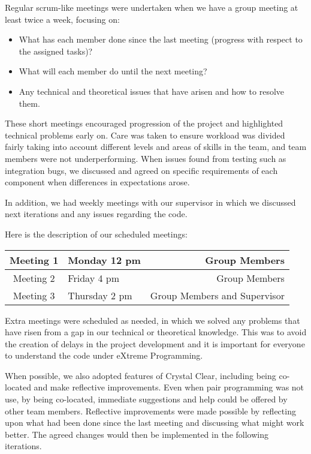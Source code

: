 Regular scrum-like meetings were undertaken when we have a group meeting at least twice a week, focusing on:

\begin{itemize}
\item What has each member done since the last meeting (progress with respect to the assigned tasks)?
\item What will each member do until the next meeting?
\item Any technical and theoretical issues that have arisen and how to resolve them.
\end{itemize}

These short meetings encouraged progression of the project and highlighted technical problems early on. Care was taken to ensure workload was divided fairly taking into account different levels and areas of skills in the team, and team members were not underperforming. When issues found from testing such as integration bugs, we discussed and agreed on specific requirements of each component when differences in expectations arose.

In addition, we had weekly meetings with our supervisor in which we discussed next iterations and any issues regarding the code.

Here is the description of our scheduled meetings:
\begin{center}
\begin{tabular}{| c | l | r |}
\hline
Meeting 1 & Monday 12 pm & Group Members \\ \hline
Meeting 2 & Friday 4 pm & Group Members \\ \hline
Meeting 3 & Thursday 2 pm & Group Members and Supervisor \\ 
\hline
\end{tabular}
\end{center}

Extra meetings were scheduled as needed, in which we solved any problems that have risen from a gap in our technical or theoretical knowledge. This was to avoid the creation of delays in the project development and it is important for everyone to understand the code under eXtreme Programming.

When possible, we also adopted features of Crystal Clear, including being co-located and make reflective improvements. Even when pair programming was not use, by being co-located, immediate suggestions and help could be offered by other team members. Reflective improvements were made possible by reflecting upon what had been done since the last meeting and discussing what might work better. The agreed changes would then be implemented in the following iterations.


